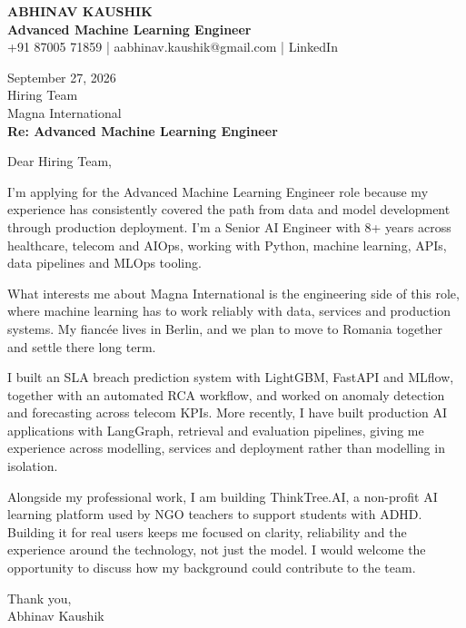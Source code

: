 \documentclass[10pt,a4paper]{article}
\begin{document}
\begin{center}
{\Large\bfseries ABHINAV KAUSHIK}\\[2pt]
{\bfseries Advanced Machine Learning Engineer}\\[2pt]
+91 87005 71859 \quad | \quad aabhinav.kaushik@gmail.com \quad | \quad LinkedIn
\end{center}
\vspace{8pt}
September 27, 2026\\[6pt]
Hiring Team\\
Magna International\\[4pt]
\textbf{Re: Advanced Machine Learning Engineer}

Dear Hiring Team,

I’m applying for the Advanced Machine Learning Engineer role because my experience has consistently covered the path from data and model development through production deployment. I’m a Senior AI Engineer with 8+ years across healthcare, telecom and AIOps, working with Python, machine learning, APIs, data pipelines and MLOps tooling.

What interests me about Magna International is the engineering side of this role, where machine learning has to work reliably with data, services and production systems. My fiancée lives in Berlin, and we plan to move to Romania together and settle there long term.

I built an SLA breach prediction system with LightGBM, FastAPI and MLflow, together with an automated RCA workflow, and worked on anomaly detection and forecasting across telecom KPIs. More recently, I have built production AI applications with LangGraph, retrieval and evaluation pipelines, giving me experience across modelling, services and deployment rather than modelling in isolation.

Alongside my professional work, I am building ThinkTree.AI, a non-profit AI learning platform used by NGO teachers to support students with ADHD. Building it for real users keeps me focused on clarity, reliability and the experience around the technology, not just the model. I would welcome the opportunity to discuss how my background could contribute to the team.

Thank you,\\
Abhinav Kaushik
\end{document}
